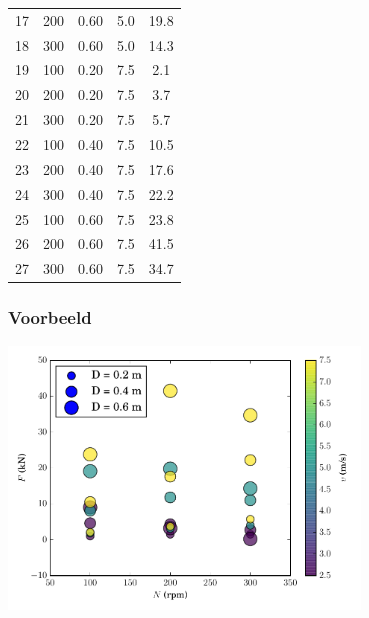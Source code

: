 \documentclass[t]{beamer}
\begin{document}
\begin{frame}
\begin{tabular}{lcccc}
	        17 & 200 & 0.60 & 5.0 & 19.8 \\     
	        18 & 300 & 0.60 & 5.0 & 14.3 \\     
	        19 & 100 & 0.20 & 7.5 & 2.1 \\      
	        20 & 200 & 0.20 & 7.5 & 3.7 \\      
	        21 & 300 & 0.20 & 7.5 & 5.7 \\      
	        22 & 100 & 0.40 & 7.5 & 10.5 \\     
	        23 & 200 & 0.40 & 7.5 & 17.6 \\     
	        24 & 300 & 0.40 & 7.5 & 22.2 \\     
	        25 & 100 & 0.60 & 7.5 & 23.8 \\     
	        26 & 200 & 0.60 & 7.5 & 41.5 \\     
	        27 & 300 & 0.60 & 7.5 & 34.7 \\                                 
			\hline
		\end{tabular}
	\end{frame}
	\begin{frame}
		\frametitle{Voorbeeld}
		\center
        \includegraphics[height=7cm]{../fig/gelijkvormigheid/Dimensieanalyse_voorbeeld_data}
	\end{frame}
\end{document}
